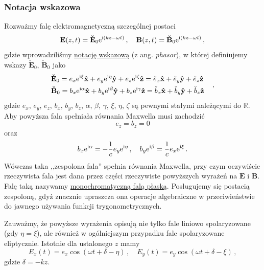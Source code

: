 \documentclass[../main.tex]{subfiles}
\begin{document}
\subsubsection{Notacja wskazowa}
Rozważmy falę elektromagnetyczną szczególnej postaci
\begin{equation*}
    \mathbf{E}(z,t)=\mathbf{\check E}_0\mathrm{e}^{\mathrm{i}(kz-\omega t)}\,,\quad \mathbf{B}(z,t)=\mathbf{\check B}_0\mathrm{e}^{\mathrm{i}(kz-\omega t)}\,,
\end{equation*}
gdzie wprowadziliśmy \underline{notację wskazową} (z ang. \textit{phasor}), w której definiujemy
wskazy \({\mathbf{\check{E}}}_0\), \({\mathbf{\check{B}}}_0\) jako
\begin{equation*}
\begin{split}
    &\mathbf{\check{E}}_0=e_x\mathrm{e}^{\mathrm{i}\xi}\mathbf{\hat{x}}+e_y\mathrm{e}^{\mathrm{i}\eta}\mathbf{\hat{y}}+e_z\mathrm{e}^{\mathrm{i}\zeta}\mathbf{\hat{z}}=\check e_x\mathbf{\hat x}+\check e_y\mathbf{\hat y}+\check e_z\mathbf{\hat z}\\
    &\mathbf{\check{B}}_0=b_x\mathrm{e}^{\mathrm{i}\alpha}\mathbf{\hat{x}}+b_y\mathrm{e}^{\mathrm{i}\beta}\mathbf{\hat{y}}+b_z\mathrm{e}^{\mathrm{i}\gamma}\mathbf{\hat{z}}=\check b_x\mathbf{\hat x}+\check b_y\mathbf{\hat y}+\check b_z\mathbf{\hat z}
\end{split}\quad\,,
\end{equation*}
gdzie \(e_x\), \(e_y\), \(e_z\), \(b_x\), \(b_y\), \(b_z\), \(\alpha\), \(\beta\), \(\gamma\),
\(\xi\), \(\eta\), \(\zeta\) są pewnymi stałymi należącymi do \(\mathbb{R}\). Aby powyższa fala
spełniała równania Maxwella musi zachodzić
\begin{equation*}
    e_z=b_z=0
\end{equation*}
oraz
\begin{equation*}
    b_x\mathrm{e}^{\mathrm{i}\alpha}=-\frac{1}{c}e_y\mathrm{e}^{\mathrm{i}\eta}\,,\quad b_y\mathrm{e}^{\mathrm{i}\beta}=\frac{1}{c}e_x\mathrm{e}^{\mathrm{i}\xi}\,.
\end{equation*}
Wówczas taka ,,zespolona fala'' spełnia równania Maxwella, przy czym oczywiście rzeczywista fala
jest dana przez części rzeczywiste powyższych wyrażeń na \(\mathbf{E}\) i \(\mathbf{B}\). Falę taką
nazywamy \underline{monochromatyczną falą płaską}. Posługujemy się postacią zespoloną, gdyż znacznie
upraszcza ona operacje algebraiczne w przeciwieństwie do jawnego używania funkcji
trygonometrycznych.
\medskip

Zauważmy, że powyższe wyrażenia opisują nie tylko fale liniowo spolaryzowane (gdy \(\eta=\xi\)), ale
również w ogólniejszym przypadku fale spolaryzowane eliptycznie. Istotnie dla ustalonego \(z\) mamy
\begin{equation*}
    E_x(t)=e_x\cos(\omega t+\delta-\eta)\,,\quad E_y(t)=e_y\cos(\omega t+\delta-\xi)\,,
\end{equation*}
gdzie \(\delta =-kz\).
\medskip
\end{document}
